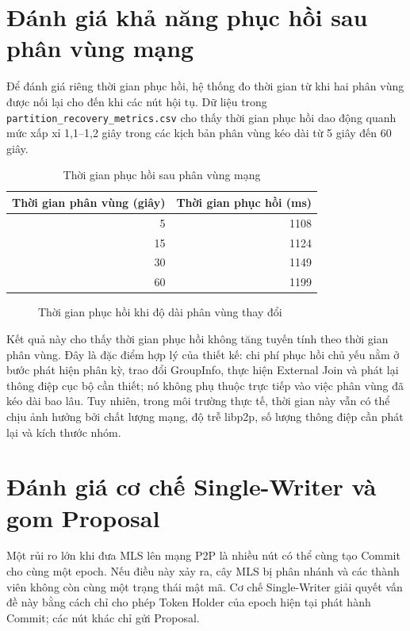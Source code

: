 \documentclass[../DoAn.tex]{subfiles}
\begin{document}
	\section{Đánh giá khả năng phục hồi sau phân vùng mạng}
	\label{sec:danh_gia_partition}
	
	Để đánh giá riêng thời gian phục hồi, hệ thống đo thời gian từ khi hai phân vùng được nối lại cho đến khi các nút hội tụ. Dữ liệu trong \texttt{partition\_recovery\_metrics.csv} cho thấy thời gian phục hồi dao động quanh mức xấp xỉ 1,1--1,2 giây trong các kịch bản phân vùng kéo dài từ 5 giây đến 60 giây.
	
	\begin{table}[htbp]
		\centering
		\caption{Thời gian phục hồi sau phân vùng mạng}
		\label{tab:partition_recovery}
		\begin{tabular}{|r|r|}
			\hline
			\textbf{Thời gian phân vùng (giây)} & \textbf{Thời gian phục hồi (ms)} \\
			\hline
			5 & 1108 \\
			\hline
			15 & 1124 \\
			\hline
			30 & 1149 \\
			\hline
			60 & 1199 \\
			\hline
		\end{tabular}
	\end{table}
	
	\begin{figure}[htbp]
		\centering
		\caption{Thời gian phục hồi khi độ dài phân vùng thay đổi}
		\label{fig:partition_recovery}
	\end{figure}
	
	Kết quả này cho thấy thời gian phục hồi không tăng tuyến tính theo thời gian phân vùng. Đây là đặc điểm hợp lý của thiết kế: chi phí phục hồi chủ yếu nằm ở bước phát hiện phân kỳ, trao đổi GroupInfo, thực hiện External Join và phát lại thông điệp cục bộ cần thiết; nó không phụ thuộc trực tiếp vào việc phân vùng đã kéo dài bao lâu. Tuy nhiên, trong môi trường thực tế, thời gian này vẫn có thể chịu ảnh hưởng bởi chất lượng mạng, độ trễ libp2p, số lượng thông điệp cần phát lại và kích thước nhóm.
	
	\section{Đánh giá cơ chế Single-Writer và gom Proposal}
	\label{sec:danh_gia_single_writer}
	
	Một rủi ro lớn khi đưa MLS lên mạng P2P là nhiều nút có thể cùng tạo Commit cho cùng một epoch. Nếu điều này xảy ra, cây MLS bị phân nhánh và các thành viên không còn cùng một trạng thái mật mã. Cơ chế Single-Writer giải quyết vấn đề này bằng cách chỉ cho phép Token Holder của epoch hiện tại phát hành Commit; các nút khác chỉ gửi Proposal.
	
\end{document}
